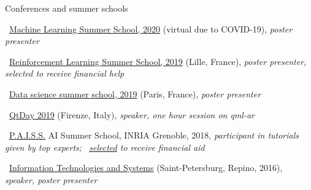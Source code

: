 \documentclass{resume} %
\newcommand*{\img}[1]{%
	\raisebox{-.02\baselineskip}{%
		\texttt{[image: \#1]}%
	}%
}
\newcommand*{\emoji}[1]{\img{./emoji/\imgpref#1.png}}
\newcommand*{\mybold}[1]{{\color{pinkunderline} #1}}
\def\imgpref{bleak-}
\newcommand{\mylink}{{\color{gray}\faExternalLink}}
\begin{document}
\begin{rSection}{Conferences and summer schools}
\vspace{-1em}
\item \emoji{flag-de} \mylink~\href{http://mlss.tuebingen.mpg.de/2020/}{Machine Learning Summer School, 2020} (virtual due to COVID-19){, \em \mybold{poster} presenter}
\item \emoji{flag-fr} \mylink~\href{https://rlss.inria.fr}{Reinforcement Learning Summer School, 2019} (Lille, France){, \em \mybold{poster} presenter, selected to receive \mybold{financial help}}
\item \emoji{flag-fr} \mylink~\href{https://ds3-datascience-polytechnique.fr}{Data science summer school, 2019} (Paris, France){, \em \mybold{poster} presenter}
\item \emoji{flag-it} \mylink~\href{https://www.qtday.it/agenda/session/52811}{QtDay 2019} (Firenze, Italy){, \em \mybold{speaker,} one hour session on qml-ar}
\item \emoji{flag-fr} \mylink~\href{https://project.inria.fr/paiss/}{P.A.I.S.S.} AI Summer School, INRIA Grenoble, 2018{, \em participant in tutorials given by top experts; \mylink~\href{http://www.europe.naverlabs.com/Blog/Students-at-PAISS}{selected} to receive financial aid }
\item \emoji{flag-ru} \mylink~\href{http://iitp.ru/en/conferences/itas}{Information Technologies and Systems} (Saint-Petersburg, Repino, 2016){, \em \mybold{speaker,} poster presenter}
\end{rSection}

\end{document}
